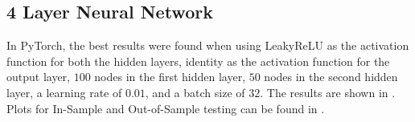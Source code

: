 \documentclass{article}
\begin{document}
%
%
%     

\subsection{4 Layer Neural Network}

In PyTorch, the best results were found when using LeakyReLU as the activation function for both the hidden layers, identity as the activation function for the output layer, $100$ nodes in the first hidden layer, $50$ nodes in the second hidden layer, a learning rate of $0.01$, and a batch size of $32$. The results are shown in . Plots for In-Sample and Out-of-Sample testing can be found in .
\end{document}
